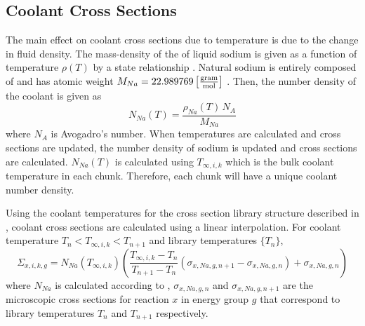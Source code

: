   \subsection{Coolant Cross Sections}
    The main effect on coolant cross sections due to temperature is due to the
    change in fluid density. The mass-density of the of liquid sodium 
    is given as a function of temperature $\rho(T)$ by a state relationship 
    \cite{sodiumProp}. Natural sodium is entirely composed of  
    and has atomic weight ${M_{Na} = 22.989769
    \left[\text{{$\frac{\text{gram}}{\text{mol}}$}}\right]}$ \cite{nuclides}.
    Then, the number density of the coolant is given as
    \begin{equation}
      \label{eq:number_density_sodium}
      N_{Na}(T) = \frac{\rho_{Na}(T) \, N_A}{M_{Na}}
    \end{equation}
    where $N_A$ is Avogadro's number. When temperatures are calculated and
    cross sections are updated, the number density of sodium is updated and
    cross sections are calculated. $N_{Na}(T)$ is calculated using
    $T_{\infty,i,k}$ which is the bulk coolant temperature in each chunk.
    Therefore, each chunk will have a unique coolant number density.
    

    Using the coolant temperatures for the cross section library structure
    described in , coolant cross sections are
    calculated using a linear interpolation. For coolant temperature
    $T_{n}<T_{\infty,i,k}<T_{n+1}$ and library temperatures $\{T_n\}$,
    \begin{equation}
      \label{eq:xs_cool}
      \Sigma_{x,i,k,g} = N_{Na}(T_{\infty,i,k}) 
        \left( \frac{T_{\infty,i,k} - T_{n}}{T_{n+1}-T_{n}} 
        (\sigma_{x,Na,g,n+1} - \sigma_{x,Na,g,n})  + \sigma_{x,Na,g,n}\right)
    \end{equation}
    where $N_{Na}$ is calculated according to ,
    $\sigma_{x,Na,g,n}$ and $\sigma_{x,Na,g,n+1}$ are the microscopic 
    cross sections for reaction $x$ in energy group $g$ that correspond to 
    library temperatures $T_n$ and $T_{n+1}$ respectively.

